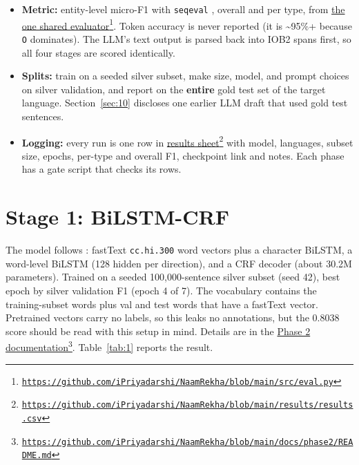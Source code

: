 \documentclass[10pt,twoside,a4paper]{article}
\begin{document}
\begin{itemize}
\item \textbf{Metric:} entity-level micro-F1 with \texttt{seqeval} \citep{nakayama2018}, overall and per type, from \href{https://github.com/iPriyadarshi/NaamRekha/blob/main/src/eval.py}{the one shared evaluator}\footnote{\href{https://github.com/iPriyadarshi/NaamRekha/blob/main/src/eval.py}{{\fontsize{8.1}{9.2}\selectfont\texttt{\mbox{https://}github.\allowbreak{}com/\allowbreak{}iPriyadarshi/\allowbreak{}NaamRekha/\allowbreak{}blob/\allowbreak{}main/\allowbreak{}src/\allowbreak{}eval.\allowbreak{}py}}}}. Token accuracy is never reported (it is \textasciitilde{}95\%+ because \texttt{O} dominates). The LLM's text output is parsed back into IOB2 spans first, so all four stages are scored identically.
\item \textbf{Splits:} train on a seeded silver subset, make size, model, and prompt choices on silver validation, and report on the \textbf{entire} gold test set of the target language. Section~\ref{sec:10} discloses one earlier LLM draft that used gold test sentences.
\item \textbf{Logging:} every run is one row in \href{https://github.com/iPriyadarshi/NaamRekha/blob/main/results/results.csv}{results sheet}\footnote{\href{https://github.com/iPriyadarshi/NaamRekha/blob/main/results/results.csv}{{\fontsize{8.1}{9.2}\selectfont\texttt{\mbox{https://}github.\allowbreak{}com/\allowbreak{}iPriyadarshi/\allowbreak{}NaamRekha/\allowbreak{}blob/\allowbreak{}main/\allowbreak{}results/\allowbreak{}results.\allowbreak{}csv}}}} with model, languages, subset size, epochs, per-type and overall F1, checkpoint link and notes. Each phase has a gate script that checks its rows.
\end{itemize}

\section{Stage 1: BiLSTM-CRF}\label{sec:3}

The model follows \citet{lample2016}: fastText \texttt{cc.hi.300} word vectors \citep{grave2018} plus a character BiLSTM, a word-level BiLSTM (128 hidden per direction), and a CRF decoder (about 30.2M parameters). Trained on a seeded 100,000-sentence silver subset (seed 42), best epoch by silver validation F1 (epoch 4 of 7). The vocabulary contains the training-subset words plus val and test words that have a fastText vector. Pretrained vectors carry no labels, so this leaks no annotations, but the 0.8038 score should be read with this setup in mind. Details are in the \href{https://github.com/iPriyadarshi/NaamRekha/blob/main/docs/phase2/README.md}{Phase 2 documentation}\footnote{\href{https://github.com/iPriyadarshi/NaamRekha/blob/main/docs/phase2/README.md}{{\fontsize{8.1}{9.2}\selectfont\texttt{\mbox{https://}github.\allowbreak{}com/\allowbreak{}iPriyadarshi/\allowbreak{}NaamRekha/\allowbreak{}blob/\allowbreak{}main/\allowbreak{}docs/\allowbreak{}phase2/\allowbreak{}README.\allowbreak{}md}}}}. Table~\ref{tab:1} reports the result.
\end{document}
